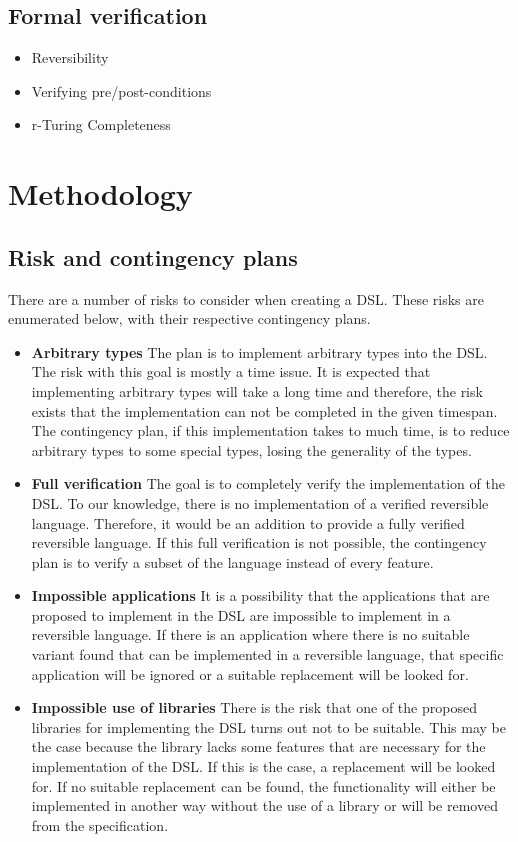 \documentclass[12pt,a4paper]{article}
\begin{document}
	\subsection{Formal verification}
	\begin{itemize}
		\item{Reversibility}
		\item{Verifying pre/post-conditions}
		\item{r-Turing Completeness}
	\end{itemize}

\section{Methodology}
\subsection{Risk and contingency plans}
There are a number of risks to consider when creating a DSL. These risks are enumerated below, with their respective contingency plans.
\begin{itemize}
\item \textbf{Arbitrary types} The plan is to implement arbitrary types into the DSL. The risk with this goal is mostly a time issue. It is expected that implementing arbitrary types will take a long time and therefore, the risk exists that the implementation can not be completed in the given timespan. The contingency plan, if this implementation takes to much time, is to reduce arbitrary types to some special types, losing the generality of the types.
\item \textbf{Full verification} The goal is to completely verify the implementation of the DSL. To our knowledge, there is no implementation of a verified reversible language. Therefore, it would be an addition to provide a fully verified reversible language. If this full verification is not possible, the contingency plan is to verify a subset of the language instead of every feature. 
\item \textbf{Impossible applications} It is a possibility that the applications that are proposed to implement in the DSL are impossible to implement in a reversible language. If there is an application where there is no suitable variant found that can be implemented in a reversible language, that specific application will be ignored or a suitable replacement will be looked for. 
\item \textbf{Impossible use of libraries} There is the risk that one of the proposed libraries for implementing the DSL turns out not to be suitable. This may be the case because the library lacks some features that are necessary for the implementation of the DSL. If this is the case, a replacement will be looked for. If no suitable replacement can be found, the functionality will either be implemented in another way without the use of a library or will be removed from the specification.
\end{itemize} 
\end{document}
